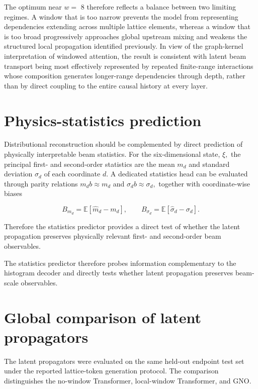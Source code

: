 The optimum near \(w =\) 8 therefore reflects a balance between two limiting regimes. A window that is too narrow prevents the model from representing dependencies extending across multiple lattice elements, whereas a window that is too broad progressively approaches global upstream mixing and weakens the structured local propagation identified previously. In view of the graph-kernel interpretation of windowed attention, the result is consistent with latent beam transport being most effectively represented by repeated finite-range interactions whose composition generates longer-range dependencies through depth, rather than by direct coupling to the entire causal history at every layer.

\section{Physics-statistics prediction}
\label{sec:05_results_physics_statistics_prediction}

Distributional reconstruction should be complemented by direct prediction of physically interpretable beam statistics. For the six-dimensional state, \(\xi ,\) the principal first- and second-order statistics are the mean \(m_{d}\) and standard deviation \(\sigma_{d}\) of each coordinate \(d .\) A dedicated statistics head can be evaluated through parity relations \(m_{d} b \approx m_{d}\) and \(\sigma_{d} b \approx \sigma_{d} ,\) together with coordinate-wise biases

\begin{equation}
\label{eq:208}
B_{m_d}=\mathbb E[\widehat m_d-m_d],\qquad B_{\sigma_d}=\mathbb E[\widehat\sigma_d-\sigma_d].
\end{equation}

Therefore the statistics predictor provides a direct test of whether the latent propagation preserves physically relevant first- and second-order beam observables.

The statistics predictor therefore probes information complementary to the histogram decoder and directly tests whether latent propagation preserves beam-scale observables.

\section{Global comparison of latent propagators}
\label{sec:05_results_global_comparison_of_latent_propagators}

The latent propagators were evaluated on the same held-out endpoint test set under the reported lattice-token generation protocol. The comparison distinguishes the no-window Transformer, local-window Transformer, and GNO.

